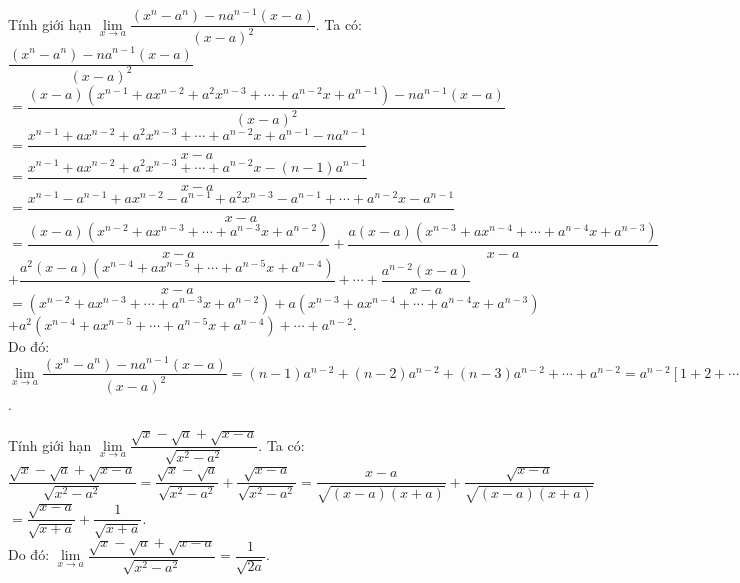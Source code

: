 \begin{bt}%
Tính giới hạn $\lim\limits_{x \to a}\dfrac{(x^n - a^n) - na^{n-1}(x-a)}{(x-a)^2}$.
\loigiai
{
Ta có: $\dfrac{(x^n - a^n) - na^{n-1}(x-a)}{(x-a)^2} $\\
$= \dfrac{(x-a)\left(x^{n-1} + ax^{n-2} + a^2x^{n-3} + \cdots + a^{n-2}x + a^{n-1}\right) - na^{n-1}(x-a)}{(x-a)^2}$\\
$= \dfrac{x^{n-1} + ax^{n-2} + a^2x^{n-3} + \cdots + a^{n-2}x + a^{n-1} - na^{n-1}}{x-a}$\\
$= \dfrac{x^{n-1} + ax^{n-2} + a^2x^{n-3} + \cdots + a^{n-2}x - (n-1)a^{n-1}}{x-a}$\\
$= \dfrac{x^{n-1} - a^{n-1} + ax^{n-2} - a^{n-1} + a^2x^{n-3} - a^{n-1} + \cdots + a^{n-2}x - a^{n-1}}{x-a}$\\
$= \dfrac{(x-a)\left(x^{n-2}+ax^{n-3}+ \cdots + a^{n-3}x + a^{n-2}\right)}{x-a} + \dfrac{a(x-a)\left(x^{n-3}+ax^{n-4}+ \cdots + a^{n-4}x + a^{n-3}\right)}{x-a}$\\
$+ \dfrac{a^2(x-a)\left(x^{n-4}+ax^{n-5}+ \cdots + a^{n-5}x + a^{n-4}\right)}{x-a} + \cdots + \dfrac{a^{n-2}(x-a)}{x-a}$\\
$= \left(x^{n-2}+ax^{n-3}+ \cdots + a^{n-3}x + a^{n-2}\right) + a\left(x^{n-3}+ax^{n-4}+ \cdots + a^{n-4}x + a^{n-3}\right)$\\
$+ a^2\left(x^{n-4}+ax^{n-5}+ \cdots + a^{n-5}x + a^{n-4}\right) + \cdots + a^{n-2}$.\\
Do đó: $\lim\limits_{x \to a}\dfrac{(x^n - a^n) - na^{n-1}(x-a)}{(x-a)^2} = (n-1)a^{n-2} + (n-2)a^{n-2} + (n-3)a^{n-2} + \cdots + a^{n-2} = a^{n-2}\left[1+ 2 + \cdots + (n-1)\right] = \dfrac{n(n-1)a^{n-2}}{2}$.
}
\end{bt}


\begin{bt}%
Tính giới hạn $\lim\limits_{x \to a} \dfrac{\sqrt{x} - \sqrt{a} + \sqrt{x-a}}{\sqrt{x^2-a^2}}$.
\loigiai
{
Ta có:\\
$\dfrac{\sqrt{x} - \sqrt{a} + \sqrt{x-a}}{\sqrt{x^2-a^2}} = \dfrac{\sqrt{x} - \sqrt{a}}{\sqrt{x^2 - a^2}} + \dfrac{\sqrt{x - a}}{\sqrt{x^2 - a^2}} = \dfrac{x - a}{\sqrt{(x-a)(x+a)}} + \dfrac{\sqrt{x-a}}{\sqrt{(x-a)(x+a)}}$\\
$= \dfrac{\sqrt{x - a}}{\sqrt{x + a}} + \dfrac{1}{\sqrt{x + a}}$.\\
Do đó: $\lim\limits_{x \to a} \dfrac{\sqrt{x} - \sqrt{a} + \sqrt{x-a}}{\sqrt{x^2-a^2}} = \dfrac{1}{\sqrt{2a}}$.
}
\end{bt}


